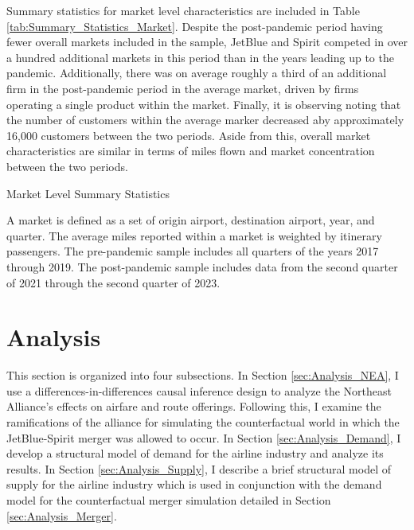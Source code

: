\documentclass{article}
\begin{document}
    Summary statistics for market level characteristics are included in Table \ref{tab:Summary_Statistics_Market}. Despite the post-pandemic period having fewer overall markets included in the sample, JetBlue and Spirit competed in over a hundred additional markets in this period than in the years leading up to the pandemic. Additionally, there was on average roughly a third of an additional firm in the post-pandemic period in the average market, driven by firms operating a single product within the market. Finally, it is observing noting that the number of customers within the average marker decreased aby approximately 16,000 customers between the two periods. Aside from this, overall market characteristics are similar in terms of miles flown and market concentration between the two periods. 

    \begin{table}
        \caption{Market Level Summary Statistics}
        \label{tab:Summary_Statistics_Market}
                \vspace{-15mm}
\begin{center}
            
                    \footnotesize{A market is defined as a set of origin airport, destination airport, year, and quarter. The average miles reported within a market is weighted by itinerary passengers. The pre-pandemic sample includes all quarters of the years 2017 through 2019. The post-pandemic sample includes data from the second quarter of 2021 through the second quarter of 2023. }

\end{center}
    \end{table}

	\section{Analysis}
	\label{sec:Analysis}
	
	This section is organized into four subsections. In Section \ref{sec:Analysis_NEA}, I use a differences-in-differences causal inference design to analyze the Northeast Alliance's effects on airfare and route offerings. Following this, I examine the ramifications of the alliance for simulating the counterfactual world in which the JetBlue-Spirit merger was allowed to occur. In Section \ref{sec:Analysis_Demand}, I develop a structural model of demand for the airline industry and analyze its results. In Section \ref{sec:Analysis_Supply}, I describe a brief structural model of supply for the airline industry which is used in conjunction with the demand model for the counterfactual merger simulation detailed in Section \ref{sec:Analysis_Merger}. 
	
\end{document}
